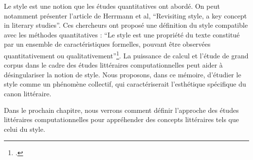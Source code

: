 Le style est une notion que les études quantitatives ont abordé. On peut notamment présenter l'article de Herrmann et al, \enquote{Revisiting style, a key concept in literary studies}. Ces chercheurs ont proposé une définition du style compatible avec les méthodes quantitatives : \enquote{Le style est une propriété du texte constitué par un ensemble de caractéristiques formelles, pouvant être observées quantitativement ou qualitativement}\footcites{BerenikeHerrmann2015RevisitingSA}. La puissance de calcul et l'étude de grand corpus dans le cadre des études littéraires computationnelles peut aider à désingulariser la notion de style. Nous proposons, dans ce mémoire, d'étudier le style comme un phénomène collectif, qui caractériserait l'esthétique spécifique du canon littéraire.

Dans le prochain chapitre, nous verrons comment définir l'approche des études littéraires computationnelles pour appréhender des concepts littéraires tels que celui du style.







